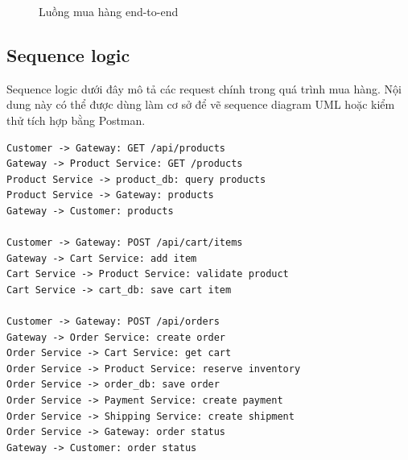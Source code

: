 \documentclass[../main.tex]{subfiles}
\begin{document}
\begin{figure}[H]
    \centering
    \caption{Luồng mua hàng end-to-end}
    \label{fig:chapter4-purchase-flow}
\end{figure}

\subsection{Sequence logic}
\label{subsection:4.7.2}

Sequence logic dưới đây mô tả các request chính trong quá trình mua hàng. Nội dung này có thể được dùng làm cơ sở để vẽ sequence diagram UML hoặc kiểm thử tích hợp bằng Postman.

\begin{lstlisting}[caption={Sequence logic của use case mua hàng}, label={lst:chapter4-purchase-sequence}]
Customer -> Gateway: GET /api/products
Gateway -> Product Service: GET /products
Product Service -> product_db: query products
Product Service -> Gateway: products
Gateway -> Customer: products

Customer -> Gateway: POST /api/cart/items
Gateway -> Cart Service: add item
Cart Service -> Product Service: validate product
Cart Service -> cart_db: save cart item

Customer -> Gateway: POST /api/orders
Gateway -> Order Service: create order
Order Service -> Cart Service: get cart
Order Service -> Product Service: reserve inventory
Order Service -> order_db: save order
Order Service -> Payment Service: create payment
Order Service -> Shipping Service: create shipment
Order Service -> Gateway: order status
Gateway -> Customer: order status
\end{lstlisting}
\end{document}

